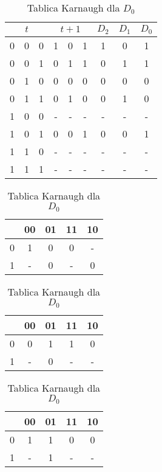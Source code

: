 \documentclass[12pt,a4paper]{article}
\begin{document}
			\begin{table}[H]
				\caption{Tabela Prawdy}
				\vspace{0.2cm}
				\centering
				\begin{tabular}{ccc|ccc|ccc}
					\multicolumn{3}{c|}{$t$}&\multicolumn{3}{c|}{$t+1$}&$D_2$&$D_1$&$D_0$\\\hline
					0&0&0 &1&0&1 &1&0&1\\
					0&0&1 &0&1&1 &0&1&1\\
					0&1&0 &0&0&0 &0&0&0\\
					0&1&1 &0&1&0 &0&1&0\\\hline
					1&0&0 &-&-&- &-&-&-\\
					1&0&1 &0&0&1 &0&0&1\\
					1&1&0 &-&-&- &-&-&-\\
					1&1&1 &-&-&- &-&-&-\\
				\end{tabular}
				\vspace{1cm}
				
				\begin{minipage}{.5\textwidth}
					\caption{Tablica Karnaugh dla $D_2$}
					\vspace{0.2cm}
					\centering
					\begin{tabular}{c|c|c|c|c}
						\backslashbox{$Q_2$}{$Q_1Q_0$}&00&01&11&10\\\hline
						0&	1&0&0&-\\\hline
						1&	-&0&-&0\\
					\end{tabular}
					
					\vspace{0.4cm}
					
					\caption{Tablica Karnaugh dla $D_1$}
					\vspace{0.2cm}
					\centering
					\begin{tabular}{c|c|c|c|c}
						\backslashbox{$Q_2$}{$Q_1Q_0$}&00&01&11&10\\\hline
						0&	0&1&1&0\\\hline
						1&	-&0&-&-\\
					\end{tabular}
				\end{minipage}%
				\begin{minipage}{.5\textwidth}
					\caption{Tablica Karnaugh dla $D_0$}
					\vspace{0.2cm}
					\centering
					\begin{tabular}{c|c|c|c|c}
						\backslashbox{$Q_2$}{$Q_1Q_0$}&00&01&11&10\\\hline
						0&	1&1&0&0\\\hline
						1&	-&1&-&-\\
					\end{tabular} 
					
				\end{minipage}
			\end{table}
	
\end{document}
